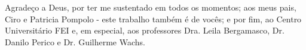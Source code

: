 \begin{agradecimentos}
Agradeço a Deus, por ter me sustentado em todos os momentos; aos meus pais, Ciro e Patricia Pompolo - este trabalho também é de vocês; e por fim, ao Centro Universitário FEI e, em especial, aos professores Dra. Leila Bergamasco, Dr. Danilo Perico e Dr. Guilherme Wachs.
\end{agradecimentos}